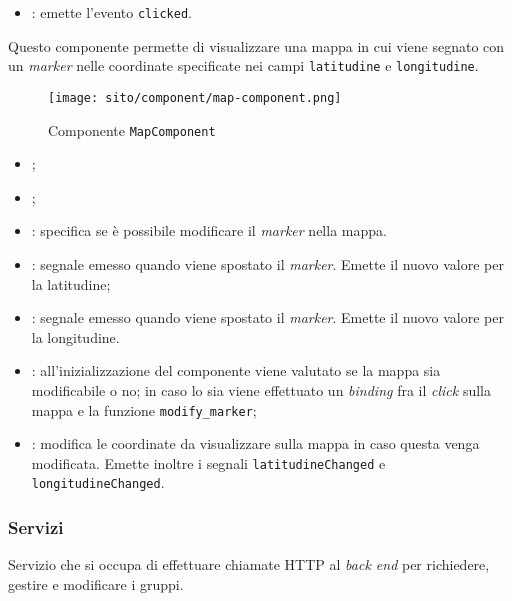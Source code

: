 \begin{itemize}
    \item {}: emette l'evento \texttt{clicked}.
\end{itemize}

\label{par:MapComponent}
Questo componente permette di visualizzare una mappa in cui viene segnato con
un \textit{marker} nelle coordinate specificate nei campi \texttt{latitudine} e
\texttt{longitudine}.
\begin{figure}[H]
    \centerline{\texttt{[image: sito/component/map-component.png]}}

    \caption{Componente \texttt{MapComponent}}
\end{figure}

\begin{itemize}
    \item {};
    \item {};
    \item {}: specifica se è possibile modificare il
          \textit{marker} nella mappa.
\end{itemize}

\begin{itemize}
    \item {}: segnale emesso quando viene spostato il
          \textit{marker}. Emette il nuovo valore per la latitudine;
    \item {}: segnale emesso quando viene spostato il
          \textit{marker}. Emette il nuovo valore per la longitudine.
\end{itemize}

\begin{itemize}
    \item {}: all'inizializzazione del componente viene valutato
          se la mappa sia modificabile o no; in caso lo sia viene effettuato
          un
          \textit{binding} fra il \textit{click} sulla mappa e la funzione
          \texttt{modify\_marker};
    \item {}: modifica le coordinate da visualizzare sulla
          mappa in caso questa venga modificata. Emette inoltre i segnali
          \texttt{latitudineChanged} e \texttt{longitudineChanged}.
\end{itemize}

\subsubsection{Servizi}
\label{par:GruppiService}
Servizio che si occupa di effettuare chiamate HTTP al \textit{back end} per
richiedere, gestire e modificare i gruppi.

